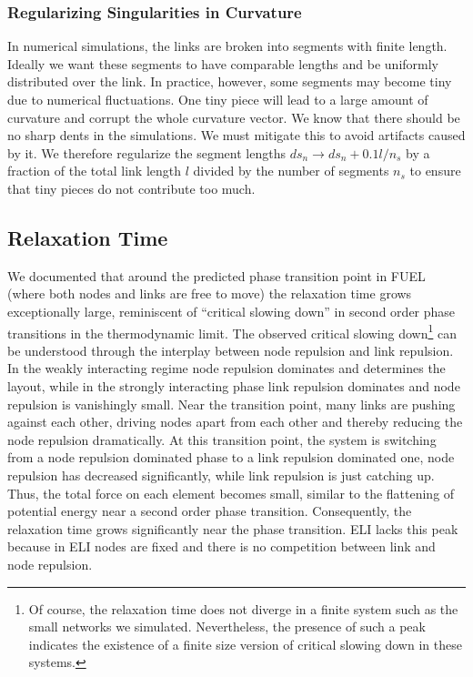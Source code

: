 \documentclass[endfloats,nofootinbib,preprint,floatfix,titlepage,superscriptaddress,linenumbers]{revtex4-1} %
\begin{document}
\subsubsection{Regularizing Singularities in Curvature}
In numerical simulations, the links are broken into segments with finite length. 
Ideally we want these segments to have comparable lengths and be uniformly distributed over the link. 
In practice, however, some segments may become tiny due to numerical fluctuations. 
One tiny piece will lead to a large amount of curvature and corrupt the whole curvature vector. 
We know that there should be no sharp dents in the simulations. %
We must mitigate this to avoid artifacts caused by it. 
We therefore regularize the segment lengths $ds_n\to ds_n+ 0.1 l/n_s$ by a fraction of the total link length $l$ divided by the number of segments $n_s$ to ensure that tiny pieces do not contribute too much. 

\subsection{Relaxation Time \label{ap:relax}}
We documented that around the predicted phase transition point in FUEL (where both nodes and links are free to move) the relaxation time grows exceptionally large, reminiscent of ``critical slowing down'' in second order phase transitions in the thermodynamic limit.  
The observed critical slowing down\footnote{Of course, the relaxation time does not diverge in a finite system such as the small networks we simulated. 
Nevertheless, the presence of such a peak indicates the existence of a finite size version of critical slowing down in these systems.} 
can be understood through the interplay between node repulsion and link repulsion. 
In the weakly interacting regime node repulsion dominates and determines the layout, while in the strongly interacting phase link repulsion dominates and node repulsion is vanishingly small. 
Near the transition point, many links are pushing against each other, driving nodes apart from each other and thereby reducing the node repulsion dramatically. 
At this transition point, the system is switching from a node repulsion dominated phase to a link repulsion dominated one, node repulsion has decreased significantly, while link repulsion is just catching up. 
Thus, the total force on each element becomes small, similar to the flattening of potential energy near a second order phase transition.
Consequently, the relaxation time grows significantly near the phase transition. 
ELI lacks this peak %
because in ELI nodes are fixed and there is no competition between link and node repulsion. 
\end{document}
